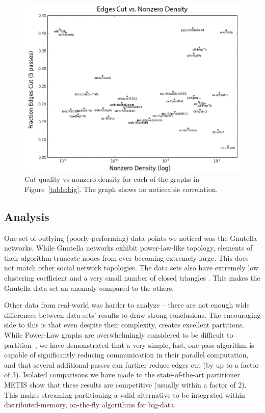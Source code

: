 \begin{figure}[h!]
\centering
\includegraphics[width=0.98\columnwidth] {figures/cutvsdensity}
\caption[Caption for]{Cut quality vs nonzero density for each of the graphs in Figure~\ref{table:big}. The graph shows no noticeable correlation.}
\end{figure}


\subsection{Analysis}

One set of outlying (poorly-performing) data points we noticed was the Gnutella networks.
While Gnutella networks exhibit power-law-like topology, elements of their algorithm truncate nodes from ever becoming extremely large. 
This does not match other social network topologies.
The data sets also have extremely low clustering coefficient and a very small number of closed triangles \cite{Ripeanu:2002:MGN:613352.613670}. 
This makes the Gnutella data set an anomaly compared to the others.

Other data from real-world was harder to analyze -- there are not enough wide differences between data sets' results to draw strong conclusions.
The encouraging side to this is that even despite their complexity, \ourmethod creates excellent partitions.
While Power-Law graphs are overwhelmingly considered to be difficult to partition~\cite{Abou-Rjeili:2006:MAP:1898953.1899055}, we have demonstrated that a very simple, fast, one-pass algorithm is capable of significantly reducing communication in their parallel computation, and that several additional passes can further reduce edges cut (by up to a factor of 3). Isolated comparisons we have made to the state-of-the-art partitioner METIS show that these results are competitive (usually within a factor of 2).
This makes streaming partitioning a valid alternative to be integrated within distributed-memory, on-the-fly algorithms for big-data.

